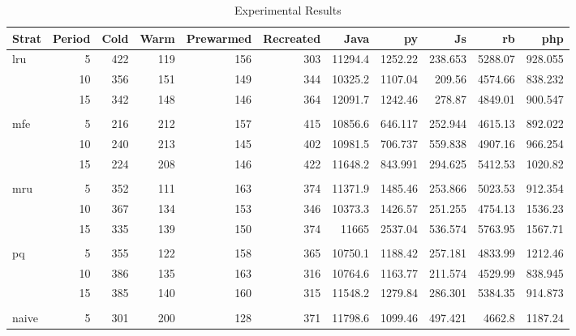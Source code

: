 \documentclass{article}
\begin{document}
\begin{table}
    \centering
\begin{tabular}{lrrrrrrrrrr}
    \hline
     Strat   &   Period &   Cold &   Warm &   Prewarmed &   Recreated &    Java &       py &      Js &      rb &      php \\
    \hline
     \multirow{3}{*}{lru}     &        5 &    422 &    119 &         156 &         303 & 11294.4 & 1252.22  & 238.653 & 5288.07 &  928.055 \\
          &       10 &    356 &    151 &         149 &         344 & 10325.2 & 1107.04  & 209.56  & 4574.66 &  838.232 \\
          &       15 &    342 &    148 &         146 &         364 & 12091.7 & 1242.46  & 278.87  & 4849.01 &  900.547 \\
        \hline \\
    \multirow{3}{*}{mfe}     &        5 &    216 &    212 &         157 &         415 & 10856.6 &  646.117 & 252.944 & 4615.13 &  892.022 \\
          &       10 &    240 &    213 &         145 &         402 & 10981.5 &  706.737 & 559.838 & 4907.16 &  966.254 \\
          &       15 &    224 &    208 &         146 &         422 & 11648.2 &  843.991 & 294.625 & 5412.53 & 1020.82  \\
          \hline \\
    \multirow{3}{*}{mru}     &        5 &    352 &    111 &         163 &         374 & 11371.9 & 1485.46  & 253.866 & 5023.53 &  912.354 \\
          &       10 &    367 &    134 &         153 &         346 & 10373.3 & 1426.57  & 251.255 & 4754.13 & 1536.23  \\
          &       15 &    335 &    139 &         150 &         374 & 11665   & 2537.04  & 536.574 & 5763.95 & 1567.71  \\
        \hline \\
    \multirow{3}{*}{pq}     &        5 &    355 &    122 &         158 &         365 & 10750.1 & 1188.42  & 257.181 & 4833.99 & 1212.46  \\
          &       10 &    386 &    135 &         163 &         316 & 10764.6 & 1163.77  & 211.574 & 4529.99 &  838.945 \\
          &       15 &    385 &    140 &         160 &         315 & 11548.2 & 1279.84  & 286.301 & 5384.35 &  914.873 \\
          \hline \\
     naive   &        5 &    301 &    200 &         128 &         371 & 11798.6 & 1099.46  & 497.421 & 4662.8  & 1187.24  \\
    \hline
\end{tabular}
\caption{\label{Table}Experimental Results}
\end{table}
\end{document}
